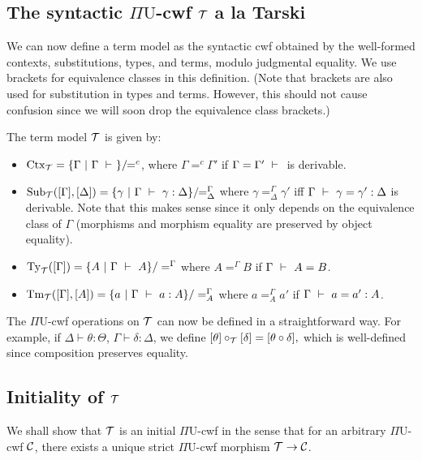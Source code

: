 \documentclass{lmcs}
\def\UU{\mathrm{U}}
\begin{document}
\subsection{The syntactic $\Pi\UU$-cwf ${\mathcal T}$ a la Tarski}
We can now define a term model as the syntactic cwf obtained by the well-formed contexts, substitutions, types, and terms, modulo judgmental equality. We use brackets for equivalence classes in this definition. (Note that brackets are also used for substitution in types and terms. However, this should not cause confusion since we will soon drop the equivalence class brackets.)

\begin{defi}
The term model ${\mathcal T}$ is given by:
\begin{itemize}
\item $\mathrm{Ctx}_{\mathcal T} = \{ {\Gamma}\ |\ \Gamma \ \vdash\  \} /\!\! =^c$, where
  ${\Gamma} =^c {\Gamma}'$ if ${\Gamma} = {\Gamma}' \ \vdash\ $ is
  derivable.
\item
  $\mathrm{Sub}_{\mathcal T}([{\Gamma}],[{\Delta}]) = \{ \gamma\ |\ \Gamma \ \vdash\  \gamma
  : {\Delta} \} /\!\! =^{\Gamma}_{\Delta}$
  where $\gamma =^{\Gamma}_{\Delta} \gamma'$ iff
  ${\Gamma} \ \vdash\  \gamma = \gamma' : {\Delta}$ is derivable. Note that
  this makes sense since it only depends on the equivalence class of
  $\Gamma$ (morphisms and morphism equality are preserved by object
  equality).
\item $\mathrm{Ty}_{\mathcal T}([{\Gamma}]) = \{ A\ |\ \Gamma \ \vdash\  A
  \}/=^{\Gamma}$ where $A =^{\Gamma} B$ if $\Gamma \ \vdash\  A =
  B$.
\item $\Tm_\T([{\Gamma}],[A]) = \{ a\ |\ \Gamma \vdashS a: A\} / =^{\Gamma}_A$ where $a =^{\Gamma}_A
a'$ if $\Gamma \ \vdash\  a = a' : A$. 
\end{itemize}
The $\Pi\UU$-cwf operations on ${\mathcal T}$ can now be defined in a straightforward way. For example, if $\Delta \vdash \theta : \Theta$, $\Gamma \vdash \delta : \Delta$, we define
$
[\theta ] \circ_{\mathcal T} [\delta] = [\theta \circ \delta],
$
which is well-defined since composition preserves equality.
\end{defi}
\subsection{Initiality of ${\mathcal T}$}
\label{sec:freenessT}

We shall show that ${\mathcal T}$ is an initial $\Pi\UU$-cwf in the sense that for an arbitrary $\Pi\UU$-cwf ${\mathcal C}$, there exists a unique strict $\Pi\UU$-cwf morphism ${\mathcal T}  \rightarrow  {\mathcal C}$. 
\end{document}
